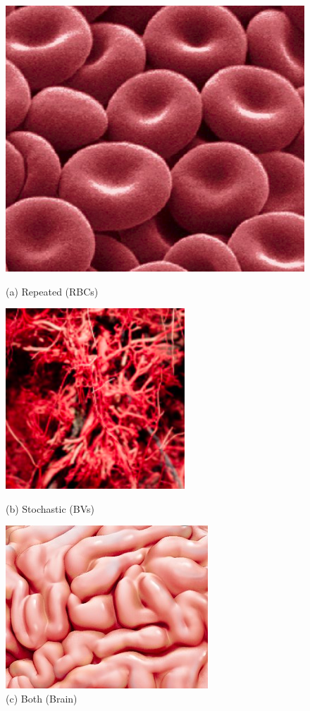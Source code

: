 \documentclass[12pt,a4paper]{report}
\begin{document}
\begin{figure}[H]
  \centering
{}
\includegraphics[scale=0.3]{pics/rbc_sample.png}
  \caption*{(a) Repeated (RBCs)}
\endminipage
\hspace*{0.5cm}
\includegraphics[scale=0.47]{pics/blood_vessels.png}
  \caption*{(b) Stochastic (BVs)}
\endminipage
{}%
\includegraphics[scale=0.52]{pics/brain.jpeg} 
  \caption*{(c) Both (Brain)}
\endminipage
\end{figure}
\end{document}
